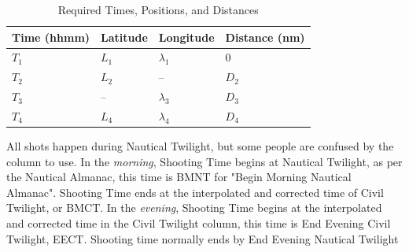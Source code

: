 \documentclass{article}
\begin{document}
\begin{table}[ht]
\centering
\begin{tabular}{|l|l|l|l|}
\hline
Time (hhmm) & Latitude & Longitude & Distance (nm)\\ %
\hline %
$T_1$ & $L_1$ & $\lambda_1$ & 0 \\ %
\hline
$T_2$ & $L_2$ & -- & $D_2$ \\ %
\hline
$T_3$ & -- & $\lambda_3$ & $D_3$ \\ %
\hline
$T_4$ & $L_4$ & $\lambda_4$ & $D_4$ \\ %
\hline
\end{tabular}
\caption{Required Times, Positions, and Distances}
\label{tab:twilight positions}
\end{table}
All shots happen during Nautical Twilight, but some people are confused by the column to use. In the \emph{morning}, Shooting Time begins at Nautical Twilight, as per the Nautical Almanac, this time is BMNT for "Begin Morning Nautical Almanac". Shooting Time ends at the interpolated and corrected time of Civil Twilight, or BMCT. In the \emph{evening}, Shooting Time begins at the interpolated and corrected time in the Civil Twilight column, this time is End Evening Civil Twilight, EECT. Shooting time normally ends by End Evening Nautical Twilight
\end{document}
